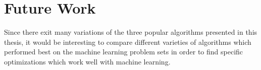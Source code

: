 \section{Future Work}

Since there exit many variations of the three popular algorithms presented in this thesis, it would be interesting to compare different varieties of algorithms which performed best on the machine learning problem sets in order to find specific optimizations which work well with machine learning.
